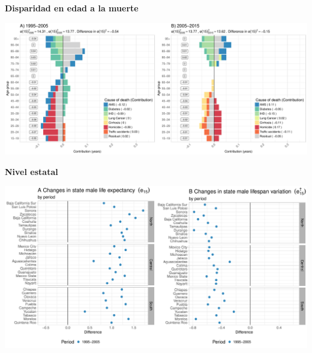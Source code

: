 \documentclass[xcolor={dvipsnames}]{beamer}
\begin{document}
\begin{frame}
\begin{center}
\Large{\textbf{Disparidad en edad a la muerte}}
\end{center}

\hspace*{-1cm}   
\includegraphics[scale=.31]{Figures/Figure_2}

\end{frame}


\begin{frame}
\begin{center}
\Large{\textbf{Nivel estatal}}
\end{center}

\hspace*{-1cm}   
\includegraphics[scale=.38]{Figures/Figure_3_1}

\end{frame}
\end{document}
